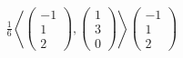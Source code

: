 \documentclass[preview]{standalone}
\begin{document}
\begin{align*}
\frac{1}{6} \left\langle  \begin{pmatrix} -1 \\ 1 \\ 2 \end{pmatrix}  ,  \begin{pmatrix} 1 \\ 3 \\ 0 \end{pmatrix}  \right\rangle  \begin{pmatrix} -1 \\ 1 \\ 2 \end{pmatrix}
\end{align*}
\end{document}

